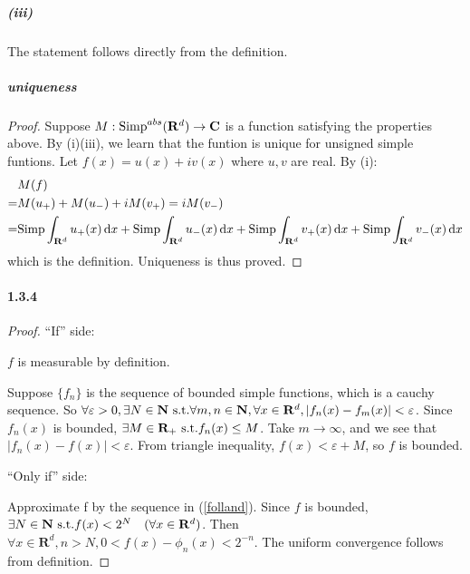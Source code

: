 \documentclass{article}
\begin{document}
\subparagraph{(iii)}
The statement follows directly from the definition.
\subparagraph{uniqueness}
\begin{proof}
Suppose $M:\mathrm{Simp}^{abs}(\mathbf{R}^d)\to \mathbf{C}$ is a function satisfying the properties above.
By (i)(iii), we learn that the funtion is unique for unsigned simple funtions. Let $f(x)=u(x)+iv(x)$ where $u,v$ are real. By (i):
\[\begin{aligned}
&M(f)\\
=&M(u_+)+M(u_-)+iM(v_+)=iM(v_-)\\
=&\mathrm{Simp}\int_{\mathbf{R}^d}u_+(x)\,\mathrm{d} x+\mathrm{Simp}\int_{\mathbf{R}^d}u_-(x)\,\mathrm{d} x+\mathrm{Simp}\int_{\mathbf{R}^d}v_+(x)\,\mathrm{d} x+\mathrm{Simp}\int_{\mathbf{R}^d}v_-(x)\,\mathrm{d} x
\end{aligned}\]
which is the definition. Uniqueness is thus proved.
\end{proof}

\paragraph{1.3.4}
\begin{proof}
``If'' side:

$f$ is measurable by definition.

Suppose $\{f_n\}$ is the sequence of bounded simple functions, which is a cauchy sequence. So $\forall \varepsilon>0, \exists N\in\mathbf{N}\text{ s.t.} \forall m,n\in \mathbf{N}, \forall x\in \mathbf{R}^d, |f_n(x)-f_m(x)|<\varepsilon$. Since $f_n(x)$ is bounded, $\exists M\in\mathbf{R}_+\text{ s.t.} f_n(x)\leq M$. Take $m\to\infty$, and we see that $|f_n(x)-f(x)|<\varepsilon$. From triangle inequality, $f(x)<\varepsilon+M$, so $f$ is bounded. 

``Only if'' side:

Approximate f by the sequence in (\ref{folland}). Since $f$ is bounded, $\exists N\in\mathbf{N}\text{ s.t.} f(x)<2^N\quad(\forall x\in\mathbf{R}^d)$. Then $\forall x\in\mathbf{R}^d, n>N, 0<f(x)-\phi_n(x)<2^{-n}$. The uniform convergence follows from definition.
\end{proof}
\end{document}
